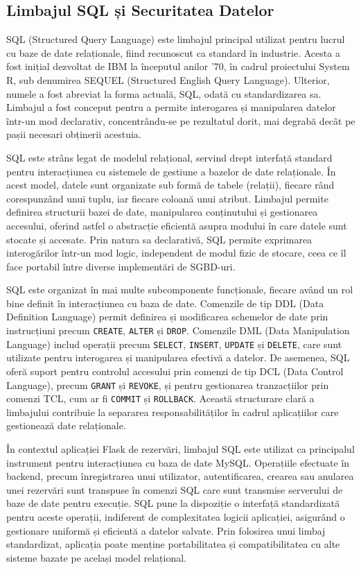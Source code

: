 \documentclass[12pt, a4paper, oneside, romanian]{teza-upb}
\begin{document}
	\subsection*{Limbajul SQL și Securitatea Datelor}
SQL (Structured Query Language) \cite{bdd} este limbajul principal utilizat pentru lucrul cu baze de date relaționale, fiind recunoscut ca standard în industrie. Acesta a fost inițial dezvoltat de IBM la începutul anilor ’70, în cadrul proiectului System R, sub denumirea SEQUEL (Structured English Query Language). Ulterior, numele a fost abreviat la forma actuală, SQL, odată cu standardizarea sa. Limbajul a fost conceput pentru a permite interogarea și manipularea datelor într-un mod declarativ, concentrându-se pe rezultatul dorit, mai degrabă decât pe pașii necesari obținerii acestuia.

SQL este strâns legat de modelul relațional, servind drept interfață standard pentru interacțiunea cu sistemele de gestiune a bazelor de date relaționale. În acest model, datele sunt organizate sub formă de tabele (relații), fiecare rând corespunzând unui tuplu, iar fiecare coloană unui atribut. Limbajul permite definirea structurii bazei de date, manipularea conținutului și gestionarea accesului, oferind astfel o abstracție eficientă asupra modului în care datele sunt stocate și accesate. Prin natura sa declarativă, SQL permite exprimarea interogărilor într-un mod logic, independent de modul fizic de stocare, ceea ce îl face portabil între diverse implementări de SGBD-uri.

SQL este organizat în mai multe subcomponente funcționale, fiecare având un rol bine definit în interacțiunea cu baza de date. Comenzile de tip DDL (Data Definition Language) permit definirea și modificarea schemelor de date prin instrucțiuni precum \texttt{CREATE}, \texttt{ALTER} și \texttt{DROP}. Comenzile DML (Data Manipulation Language) includ operații precum \texttt{SELECT}, \texttt{INSERT}, \texttt{UPDATE} și \texttt{DELETE}, care sunt utilizate pentru interogarea și manipularea efectivă a datelor. De asemenea, SQL oferă suport pentru controlul accesului prin comenzi de tip DCL (Data Control Language), precum \texttt{GRANT} și \texttt{REVOKE}, și pentru gestionarea tranzacțiilor prin comenzi TCL, cum ar fi \texttt{COMMIT} și \texttt{ROLLBACK}. Această structurare clară a limbajului contribuie la separarea responsabilităților în cadrul aplicațiilor care gestionează date relaționale.

În contextul aplicației Flask de rezervări, limbajul SQL este utilizat ca principalul instrument pentru interacțiunea cu baza de date MySQL. Operațiile efectuate în backend, precum înregistrarea unui utilizator, autentificarea, crearea sau anularea unei rezervări sunt transpuse în comenzi SQL care sunt transmise serverului de baze de date pentru execuție. SQL pune la dispoziție o interfață standardizată pentru aceste operații, indiferent de complexitatea logicii aplicației, asigurând o gestionare uniformă și eficientă a datelor salvate. Prin folosirea unui limbaj standardizat, aplicația poate menține portabilitatea și compatibilitatea cu alte sisteme bazate pe același model relațional.
\end{document}
